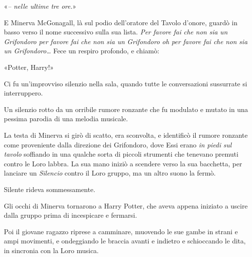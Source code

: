 «\textit{– nelle ultime tre ore.}»

E Minerva McGonagall, là sul podio dell’oratore del Tavolo d’onore, guardò in basso verso il nome successivo sulla sua lista. \textit{Per favore fai che non sia un Grifondoro per favore fai che non sia un Grifondoro oh per favore fai che non sia un Grifondoro…} Fece un respiro profondo, e chiamò:

«Potter, Harry!»

Ci fu un’improvviso silenzio nella sala, quando tutte le conversazioni sussurrate si interruppero.

Un silenzio rotto da un orribile rumore ronzante che fu modulato e mutato in una pessima parodia di una melodia musicale.

La testa di Minerva si girò di scatto, era sconvolta, e identificò il rumore ronzante come proveniente dalla direzione dei Grifondoro, dove Essi erano \textit{in piedi sul tavolo} soffiando in una qualche sorta di piccoli strumenti che tenevano premuti contro le Loro labbra. La sua mano iniziò a scendere verso la sua bacchetta, per lanciare un \textit{Silencio} contro il Loro gruppo, ma un altro suono la fermò.

Silente rideva sommessamente.

Gli occhi di Minerva tornarono a Harry Potter, che aveva appena iniziato a uscire dalla gruppo prima di incespicare e fermarsi.

Poi il giovane ragazzo riprese a camminare, muovendo le sue gambe in strani e ampi movimenti, e ondeggiando le braccia avanti e indietro e schioccando le dita, in sincronia con la Loro musica.

